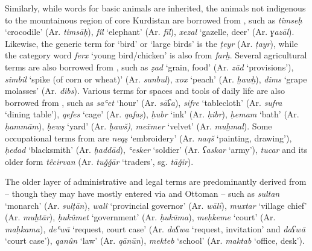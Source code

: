 \documentclass[output=paper]{langsci/langscibook}
\begin{document}
Similarly, while words for basic animals are inherited, the animals not indigenous to the mountainous region of core Kurdistan are borrowed from , such as \textit{tîmseḥ} ‘crocodile’ (Ar. \textit{timsāḥ}), \textit{fîl} ‘elephant’ (Ar. \textit{fīl}), \textit{xezal} ‘gazelle, deer’ (Ar. \textit{ɣazāl}). Likewise, the generic term for ‘bird’ or ‘large birds’ is the   \textit{ṭeyr} (Ar. \textit{ṭayr}), while the category word \textit{ferx} ‘young bird/chicken’ is also from  \textit{farḫ}. Several agricultural terms are also borrowed from , such as \textit{ẓad} ‘grain, food’ (Ar. \textit{zād} `provisions'), \textit{simbil} ‘spike (of corn or wheat)’ (Ar. \textit{sunbul}), \textit{xox} ‘peach’ (Ar. \textit{ḫawḫ}), \textit{dims} ‘grape molasses’ (Ar. \textit{dibs}). Various terms for spaces and tools of daily life are also borrowed from , such as \textit{saʿet} ‘hour’ (Ar. \textit{sāʕa}), \textit{sifre} ‘tablecloth’ (Ar. \textit{sufra} ‘dining table’), \textit{qefes} ‘cage’ (Ar. \textit{qafaṣ}), \textit{ḥubr} ‘ink’ (Ar. \textit{ḥibr}), \textit{ḥemam} ‘bath’ (Ar. \textit{ḥammām}), \textit{ḥewş} ‘yard’ (Ar. \textit{ḥawš)}, \textit{meẍmer} ‘velvet’ (Ar. \textit{muḫmal}). Some occupational terms from  are \textit{neqş} ‘embroidery’ (Ar. \textit{naqš} ‘painting, drawing’), \textit{ḥedad} ‘blacksmith’ (Ar. \textit{ḥaddād}), \textit{ʿesker} ‘soldier’ (Ar. \textit{ʕaskar} ‘army’), \textit{tucar} and its older form \textit{têcirvan} (Ar. \textit{tuǧǧār} ‘traders’, sg. \textit{tāǧir}).  

The older layer of administrative and legal terms are predominantly derived from  – though they may have mostly entered via  and Ottoman  – such as \textit{sultan} ‘monarch’ (Ar. \textit{sulṭān}), \textit{walî} ‘provincial governor’ (Ar. \textit{wālī}), \textit{muxtar} ‘village chief’ (Ar. \textit{muḫtār}), \textit{ḥukûmet} ‘government’ (Ar. \textit{ḥukūma}), \textit{meḥkeme} ‘court’ (Ar. \textit{maḥkama}), \textit{deʿwā} ‘request, court case’ (Ar. \textit{daʕwa} ‘request, invitation’ and \textit{daʕwā} ‘court case’), \textit{qanûn} ‘law’ (Ar. \textit{qānūn}), \textit{mekteb} ‘school’ (Ar. \textit{maktab} ‘office, desk’).  
\end{document}
